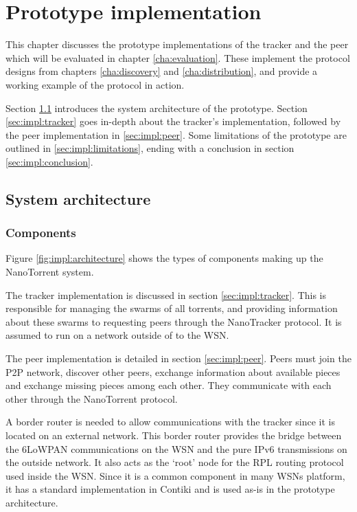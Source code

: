 \chapter{Prototype implementation}
\label{cha:implementation}
This chapter discusses the prototype implementations of the tracker and the peer which will be evaluated in chapter \ref{cha:evaluation}. These implement the protocol designs from chapters \ref{cha:discovery} and \ref{cha:distribution}, and provide a working example of the protocol in action.

Section \ref{sec:impl:architecture} introduces the system architecture of the prototype. Section \ref{sec:impl:tracker} goes in-depth about the tracker's implementation, followed by the peer implementation in \ref{sec:impl:peer}. Some limitations of the prototype are outlined in \ref{sec:impl:limitations}, ending with a conclusion in section \ref{sec:impl:conclusion}.

\section{System architecture}
\label{sec:impl:architecture}

\subsection{Components}
Figure \ref{fig:impl:architecture} shows the types of components making up the NanoTorrent system. 

The tracker implementation is discussed in section \ref{sec:impl:tracker}. This is responsible for managing the swarms of all torrents, and providing information about these swarms to requesting peers through the NanoTracker protocol. It is assumed to run on a network outside of to the \gls{WSN}.

The peer implementation is detailed in section \ref{sec:impl:peer}. Peers must join the \gls{P2P} network, discover other peers, exchange information about available pieces and exchange missing pieces among each other. They communicate with each other through the NanoTorrent protocol.

A border router is needed to allow communications with the tracker since it is located on an external network. This border router provides the bridge between the \gls{6LoWPAN} communications on the \gls{WSN} and the pure \gls{IPv6} transmissions on the outside network. It also acts as the `root' node for the \gls{RPL} routing protocol used inside the \gls{WSN}. Since it is a common component in many \glspl{WSN} platform, it has a standard implementation in Contiki and is used as-is in the prototype architecture.

